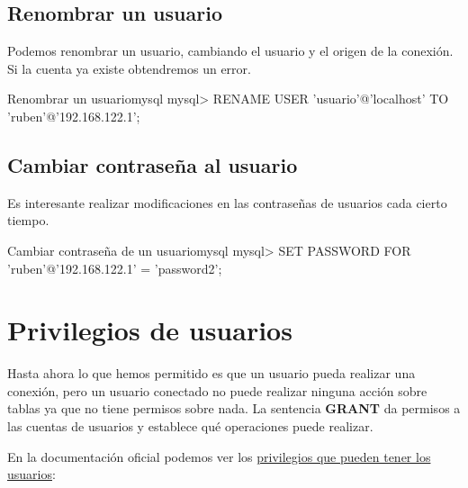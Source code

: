 \subsection{Renombrar un usuario}
Podemos renombrar un usuario, cambiando el usuario y el origen de la conexión. Si la cuenta ya existe obtendremos un error.

\begin{mycode}{Renombrar un usuario}{mysql}{}
mysql> RENAME USER 'usuario'@'localhost' TO 'ruben'@'192.168.122.1';
\end{mycode}


\subsection{Cambiar contraseña al usuario}
Es interesante realizar modificaciones en las contraseñas de usuarios cada cierto tiempo.

\begin{mycode}{Cambiar contraseña de un usuario}{mysql}{}
mysql> SET PASSWORD FOR 'ruben'@'192.168.122.1' = 'password2';
\end{mycode}

\section{Privilegios de usuarios}
Hasta ahora lo que hemos permitido es que un usuario pueda realizar una conexión, pero un usuario conectado no puede realizar ninguna acción sobre tablas ya que no tiene permisos sobre nada. La sentencia \textbf{GRANT} da permisos a las cuentas de usuarios y establece qué operaciones puede realizar.

En la documentación oficial podemos ver los \href{https://dev.mysql.com/doc/refman/8.0/en/privileges-provided.html}{privilegios que pueden tener los usuarios}:


